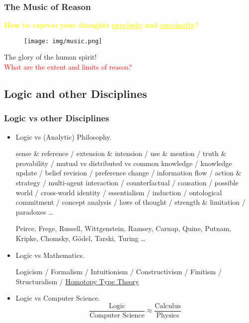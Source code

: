 \documentclass[UTF8,aspectratio=43,11pt,colorlinks,compress,openany]{beamer}%
\begin{document}
\begin{frame}\frametitle{The Music of Reason}
	\begin{center}
		\large{\textcolor{yellow}{\textbf{How to \textit{express} your thoughts \underline{precisely} and \underline{succinctly}?}}}
	\end{center}
	\begin{figure}
		\texttt{[image: img/music.png]}
	\end{figure}
	\begin{center}
	The glory of the human spirit!\\
	\large{\textcolor{red}{What are the extent and limits of reason?}}
	\end{center}
\end{frame}

\subsection{Logic and other Disciplines}

\begin{frame}\frametitle{Logic vs other Disciplines}
		\begin{itemize}
			\item Logic vs (Analytic) Philosophy.
			
			sense \& reference / extension \& intension / use \& mention / truth \& provability / mutual vs distributed vs common knowledge / knowledge update / belief revision / preference change / information flow / action \& strategy / multi-agent interaction / counterfactual / causation / possible world / cross-world identity / essentialism / induction / ontological commitment / concept analysis / laws of thought / strength \& limitation / paradoxes \dots
			
			Peirce, Frege, Russell, Wittgenstein, Ramsey, Carnap, Quine, Putnam, Kripke, Chomsky, G\"odel, Tarski, Turing \dots
			\item Logic vs Mathematics.
			
			Logicism / Formalism / Intuitionism / Constructivism / Finitism / Structuralism / \href{https://homotopytypetheory.org/book/}{Homotopy Type Theory}
			\item Logic vs Computer Science.
			\[\dfrac{\text{Logic}}{\text{Computer Science}} \approx \dfrac{\text{Calculus}}{\text{Physics}}\]
		\end{itemize}
\end{frame}
\end{document}
